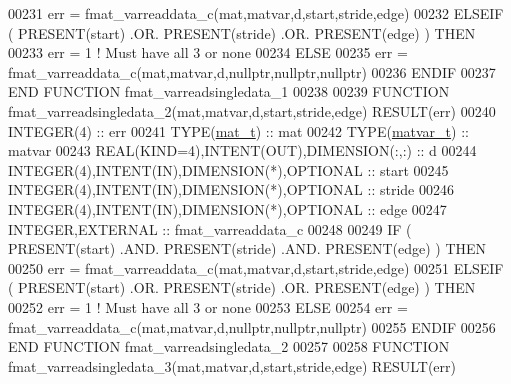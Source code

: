 \begin{DoxyCode}
00231         err = fmat\_varreaddata\_c(mat,matvar,d,start,stride,edge)
00232     \textcolor{keywordflow}{ELSEIF} ( \textcolor{keyword}{PRESENT}(start) .OR. \textcolor{keyword}{PRESENT}(stride) .OR. \textcolor{keyword}{PRESENT}(edge) ) \textcolor{keywordflow}{THEN}
00233         err = 1    \textcolor{comment}{! Must have all 3 or none}
00234     \textcolor{keywordflow}{ELSE}
00235         err = fmat\_varreaddata\_c(mat,matvar,d,nullptr,nullptr,nullptr)
00236 \textcolor{keywordflow}{    ENDIF}
00237 \textcolor{keyword}{END FUNCTION }fmat\_varreadsingledata\_1
00238 
00239 \textcolor{keyword}{FUNCTION }fmat\_varreadsingledata\_2(mat,matvar,d,start,stride,edge) \textcolor{keyword}{RESULT}(err)
00240     \textcolor{keywordtype}{INTEGER(4)}                                  :: err
00241     \textcolor{keywordtype}{TYPE}(\hyperlink{group___m_a_t_gab0fc888f5a5d79943b16284b1f91c2e8}{mat\_t})                                 :: mat
00242     \textcolor{keywordtype}{TYPE}(\hyperlink{group___m_a_t_structmatvar__t}{matvar\_t})                              :: matvar
00243     \textcolor{keywordtype}{REAL(KIND=4)},\textcolor{keywordtype}{INTENT(OUT)},\textcolor{keywordtype}{DIMENSION(:,:)}     :: d
00244     \textcolor{keywordtype}{INTEGER(4)},\textcolor{keywordtype}{INTENT(IN)},\textcolor{keywordtype}{DIMENSION(*)},\textcolor{keywordtype}{OPTIONAL} :: start
00245     \textcolor{keywordtype}{INTEGER(4)},\textcolor{keywordtype}{INTENT(IN)},\textcolor{keywordtype}{DIMENSION(*)},\textcolor{keywordtype}{OPTIONAL} :: stride
00246     \textcolor{keywordtype}{INTEGER(4)},\textcolor{keywordtype}{INTENT(IN)},\textcolor{keywordtype}{DIMENSION(*)},\textcolor{keywordtype}{OPTIONAL} :: edge
00247     \textcolor{keywordtype}{INTEGER},\textcolor{keywordtype}{EXTERNAL}                            :: fmat\_varreaddata\_c
00248 
00249     \textcolor{keywordflow}{IF} ( \textcolor{keyword}{PRESENT}(start) .AND. \textcolor{keyword}{PRESENT}(stride) .AND. \textcolor{keyword}{PRESENT}(edge) ) \textcolor{keywordflow}{THEN}
00250         err = fmat\_varreaddata\_c(mat,matvar,d,start,stride,edge)
00251     \textcolor{keywordflow}{ELSEIF} ( \textcolor{keyword}{PRESENT}(start) .OR. \textcolor{keyword}{PRESENT}(stride) .OR. \textcolor{keyword}{PRESENT}(edge) ) \textcolor{keywordflow}{THEN}
00252         err = 1    \textcolor{comment}{! Must have all 3 or none}
00253     \textcolor{keywordflow}{ELSE}
00254         err = fmat\_varreaddata\_c(mat,matvar,d,nullptr,nullptr,nullptr)
00255 \textcolor{keywordflow}{    ENDIF}
00256 \textcolor{keyword}{END FUNCTION }fmat\_varreadsingledata\_2
00257 
00258 \textcolor{keyword}{FUNCTION }fmat\_varreadsingledata\_3(mat,matvar,d,start,stride,edge) \textcolor{keyword}{RESULT}(err)

\end{DoxyCode}
